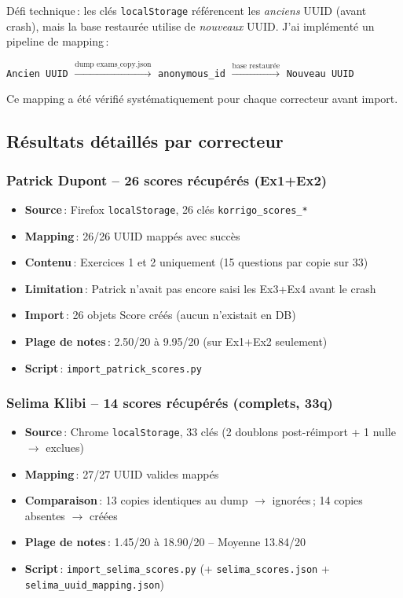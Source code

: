 \documentclass[11pt,a4paper]{article}
\begin{document}
D\'{e}fi technique\,: les cl\'{e}s \texttt{localStorage} r\'{e}f\'{e}rencent les \emph{anciens} UUID (avant crash), mais la base restaur\'{e}e utilise de \emph{nouveaux} UUID. J'ai impl\'{e}ment\'{e} un pipeline de mapping\,:

\begin{center}
	\texttt{Ancien UUID} $\xrightarrow{\text{dump exams\_copy.json}}$ \texttt{anonymous\_id} $\xrightarrow{\text{base restaur\'{e}e}}$ \texttt{Nouveau UUID}
\end{center}

Ce mapping a \'{e}t\'{e} v\'{e}rifi\'{e} syst\'{e}matiquement pour chaque correcteur avant import.

\subsection{R\'{e}sultats d\'{e}taill\'{e}s par correcteur}

\subsubsection{Patrick Dupont -- 26 scores r\'{e}cup\'{e}r\'{e}s (Ex1+Ex2)}

\begin{itemize}
	\item \textbf{Source}\,: Firefox \texttt{localStorage}, 26 cl\'{e}s \texttt{korrigo\_scores\_*}
	\item \textbf{Mapping}\,: 26/26 UUID mapp\'{e}s avec succ\`{e}s
	\item \textbf{Contenu}\,: Exercices 1 et 2 uniquement (15 questions par copie sur 33)
	\item \textbf{Limitation}\,: Patrick n'avait pas encore saisi les Ex3+Ex4 avant le crash
	\item \textbf{Import}\,: 26 objets Score cr\'{e}\'{e}s (aucun n'existait en DB)
	\item \textbf{Plage de notes}\,: 2.50/20 \`{a} 9.95/20 (sur Ex1+Ex2 seulement)
	\item \textbf{Script}\,: \texttt{import\_patrick\_scores.py}
\end{itemize}

\subsubsection{Selima Klibi -- 14 scores r\'{e}cup\'{e}r\'{e}s (complets, 33q)}

\begin{itemize}
	\item \textbf{Source}\,: Chrome \texttt{localStorage}, 33 cl\'{e}s (2 doublons post-r\'{e}import + 1 nulle $\to$ exclues)
	\item \textbf{Mapping}\,: 27/27 UUID valides mapp\'{e}s
	\item \textbf{Comparaison}\,: 13 copies identiques au dump $\to$ ignor\'{e}es\,; 14 copies absentes $\to$ cr\'{e}\'{e}es
	\item \textbf{Plage de notes}\,: 1.45/20 \`{a} 18.90/20 -- Moyenne 13.84/20
	\item \textbf{Script}\,: \texttt{import\_selima\_scores.py} (+ \texttt{selima\_scores.json} + \texttt{selima\_uuid\_mapping.json})
\end{itemize}
\end{document}

